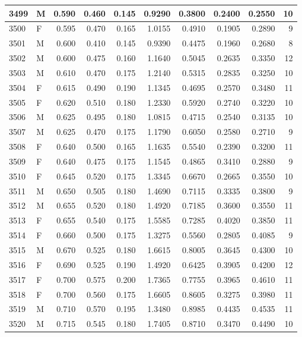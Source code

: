 \documentclass[9pt,twocolumn,twoside,]{pnas-new}
\begin{document}
\begin{tabular}{l|l|r|r|r|r|r|r|r|r}
\hline
3499 & M & 0.590 & 0.460 & 0.145 & 0.9290 & 0.3800 & 0.2400 & 0.2550 & 10\\
\hline
3500 & F & 0.595 & 0.470 & 0.165 & 1.0155 & 0.4910 & 0.1905 & 0.2890 & 9\\
\hline
3501 & M & 0.600 & 0.410 & 0.145 & 0.9390 & 0.4475 & 0.1960 & 0.2680 & 8\\
\hline
3502 & M & 0.600 & 0.475 & 0.160 & 1.1640 & 0.5045 & 0.2635 & 0.3350 & 12\\
\hline
3503 & M & 0.610 & 0.470 & 0.175 & 1.2140 & 0.5315 & 0.2835 & 0.3250 & 10\\
\hline
3504 & F & 0.615 & 0.490 & 0.190 & 1.1345 & 0.4695 & 0.2570 & 0.3480 & 11\\
\hline
3505 & F & 0.620 & 0.510 & 0.180 & 1.2330 & 0.5920 & 0.2740 & 0.3220 & 10\\
\hline
3506 & M & 0.625 & 0.495 & 0.180 & 1.0815 & 0.4715 & 0.2540 & 0.3135 & 10\\
\hline
3507 & M & 0.625 & 0.470 & 0.175 & 1.1790 & 0.6050 & 0.2580 & 0.2710 & 9\\
\hline
3508 & F & 0.640 & 0.500 & 0.165 & 1.1635 & 0.5540 & 0.2390 & 0.3200 & 11\\
\hline
3509 & F & 0.640 & 0.475 & 0.175 & 1.1545 & 0.4865 & 0.3410 & 0.2880 & 9\\
\hline
3510 & F & 0.645 & 0.520 & 0.175 & 1.3345 & 0.6670 & 0.2665 & 0.3550 & 10\\
\hline
3511 & M & 0.650 & 0.505 & 0.180 & 1.4690 & 0.7115 & 0.3335 & 0.3800 & 9\\
\hline
3512 & M & 0.655 & 0.520 & 0.180 & 1.4920 & 0.7185 & 0.3600 & 0.3550 & 11\\
\hline
3513 & F & 0.655 & 0.540 & 0.175 & 1.5585 & 0.7285 & 0.4020 & 0.3850 & 11\\
\hline
3514 & F & 0.660 & 0.500 & 0.175 & 1.3275 & 0.5560 & 0.2805 & 0.4085 & 9\\
\hline
3515 & M & 0.670 & 0.525 & 0.180 & 1.6615 & 0.8005 & 0.3645 & 0.4300 & 10\\
\hline
3516 & F & 0.690 & 0.525 & 0.190 & 1.4920 & 0.6425 & 0.3905 & 0.4200 & 12\\
\hline
3517 & F & 0.700 & 0.575 & 0.200 & 1.7365 & 0.7755 & 0.3965 & 0.4610 & 11\\
\hline
3518 & F & 0.700 & 0.560 & 0.175 & 1.6605 & 0.8605 & 0.3275 & 0.3980 & 11\\
\hline
3519 & M & 0.710 & 0.570 & 0.195 & 1.3480 & 0.8985 & 0.4435 & 0.4535 & 11\\
\hline
3520 & M & 0.715 & 0.545 & 0.180 & 1.7405 & 0.8710 & 0.3470 & 0.4490 & 10\\

\end{tabular}
\end{document}
